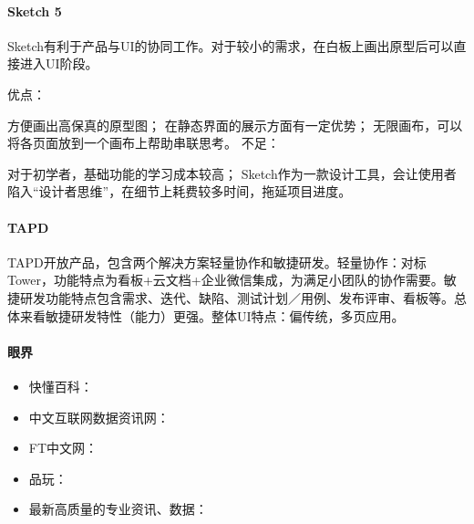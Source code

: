 \documentclass[letterpaper,11pt,english]{sphinxmanual}
\begin{document}
\paragraph{Sketch 5\sphinxfootnotemark[504]}
\label{\detokenize{chapter_knowledge/tools:sketch-5}}%
\begin{footnotetext}[504]\sphinxAtStartFootnote
{}
%
\end{footnotetext}\ignorespaces 
Sketch有利于产品与UI的协同工作。对于较小的需求，在白板上画出原型后可以直接进入UI阶段。

优点：

方便画出高保真的原型图； 在静态界面的展示方面有一定优势；
无限画布，可以将各页面放到一个画布上帮助串联思考。 不足：

对于初学者，基础功能的学习成本较高；
Sketch作为一款设计工具，会让使用者陷入“设计者思维”，在细节上耗费较多时间，拖延项目进度。


\paragraph{TAPD}
\label{\detokenize{chapter_knowledge/tools:tapd}}
TAPD开放产品，包含两个解决方案\sphinxhyphen{}轻量协作和敏捷研发。轻量协作：对标Tower，功能特点为看板+云文档+企业微信集成，为满足小团队的协作需要。敏捷研发功能特点包含需求、迭代、缺陷、测试计划／用例、发布评审、看板等。总体来看敏捷研发特性（能力）更强。整体UI特点：偏传统，多页应用。



\paragraph{眼界}
\label{\detokenize{chapter_knowledge/tools:id3}}\begin{itemize}
\item {} 
快懂百科：

\item {} 
中文互联网数据资讯网：

\item {} 
FT中文网：

\item {} 
品玩：

\item {} 
最新高质量的专业资讯、数据：

\end{itemize}
\end{document}

